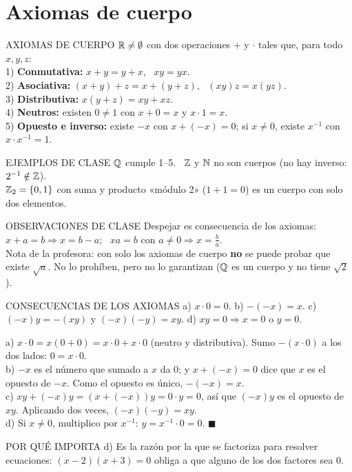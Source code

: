 \section{Axiomas de cuerpo}
\apuntes
\begin{sello}{AXIOMAS DE CUERPO}
$\mathbb{R}\neq\emptyset$ con dos operaciones $+$ y $\cdot$ tales que, para todo $x,y,z$:\\[2pt]
1) \textbf{Conmutativa:} $x+y=y+x$, \ $xy=yx$.\\
2) \textbf{Asociativa:} $(x+y)+z=x+(y+z)$, \ $(xy)z=x(yz)$.\\
3) \textbf{Distributiva:} $x(y+z)=xy+xz$.\\
4) \textbf{Neutros:} existen $0\neq1$ con $x+0=x$ y $x\cdot1=x$.\\
5) \textbf{Opuesto e inverso:} existe $-x$ con $x+(-x)=0$; si $x\neq0$, existe $x^{-1}$ con $x\cdot x^{-1}=1$.
\end{sello}
\begin{memo}{EJEMPLOS DE CLASE}
$\mathbb{Q}$ cumple 1--5. \ $\mathbb{Z}$ y $\mathbb{N}$ no son cuerpos (no hay inverso: $2^{-1}\notin\mathbb{Z}$).\\
$\mathbb{Z}_2=\{0,1\}$ con suma y producto «módulo 2» ($1+1=0$) es un cuerpo con solo dos elementos.
\end{memo}
\apuntes
\begin{memo}{OBSERVACIONES DE CLASE}
Despejar es consecuencia de los axiomas: $x+a=b\Rightarrow x=b-a$; \ $xa=b$ con $a\neq0\Rightarrow x=\frac ba$.\\
Nota de la profesora: con solo los axiomas de cuerpo \textbf{no} se puede probar que existe $\sqrt a$. No lo prohíben, pero no lo garantizan ($\mathbb{Q}$ es un cuerpo y no tiene $\sqrt2$).
\end{memo}

\agregado
\begin{sello}{CONSECUENCIAS DE LOS AXIOMAS}
a) $x\cdot0=0$. \quad b) $-(-x)=x$. \quad c) $(-x)y=-(xy)$ y $(-x)(-y)=xy$. \quad d) $xy=0\Rightarrow x=0$ o $y=0$.
\end{sello}
\begin{demo}
a) $x\cdot0=x(0+0)=x\cdot0+x\cdot0$ (neutro y distributiva). Sumo $-(x\cdot0)$ a los dos lados: $0=x\cdot0$.\\[2pt]
b) $-x$ es el número que sumado a $x$ da 0; y $x+(-x)=0$ dice que $x$ es el opuesto de $-x$. Como el opuesto es único, $-(-x)=x$.\\[2pt]
c) $xy+(-x)y=(x+(-x))y=0\cdot y=0$, así que $(-x)y$ es el opuesto de $xy$. Aplicando dos veces, $(-x)(-y)=xy$.\\[2pt]
d) Si $x\neq0$, multiplico por $x^{-1}$: $y=x^{-1}\cdot0=0$. $\blacksquare$
\end{demo}
\begin{tip}{POR QUÉ IMPORTA d)}
Es la razón por la que se factoriza para resolver ecuaciones: $(x-2)(x+3)=0$ obliga a que alguno de los dos factores sea 0.
\end{tip}


